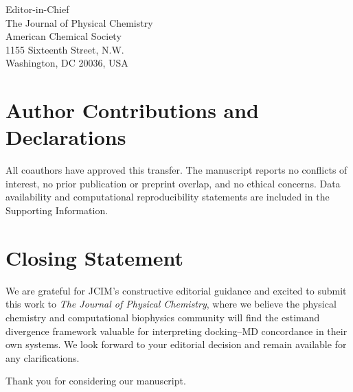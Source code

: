 \documentclass[11pt]{letter}
\begin{document}
\begin{letter}{%
    Editor-in-Chief \\
    The Journal of Physical Chemistry \\
    American Chemical Society \\
    1155 Sixteenth Street, N.W. \\
    Washington, DC 20036, USA
}
\section*{Author Contributions and Declarations}

All coauthors have approved this transfer. The manuscript reports no conflicts of interest, no prior publication or preprint overlap, and no ethical concerns. Data availability and computational reproducibility statements are included in the Supporting Information.

%
%
%    
%    
%    

\section*{Closing Statement}

We are grateful for JCIM's constructive editorial guidance and excited to submit this work to \textit{The Journal of Physical Chemistry}, where we believe the physical chemistry and computational biophysics community will find the estimand divergence framework valuable for interpreting docking--MD concordance in their own systems. We look forward to your editorial decision and remain available for any clarifications.

Thank you for considering our manuscript.


\end{letter}
\end{document}

